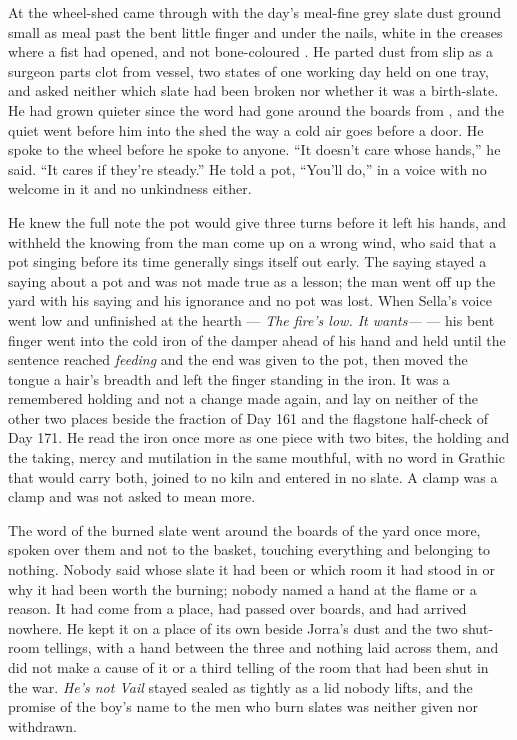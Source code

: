 At the wheel-shed  came through with the day's meal-fine grey slate dust ground small as meal past the bent little finger and under the nails, white in the creases where a fist had opened, and not bone-coloured . He parted dust from slip as a surgeon parts clot from vessel, two states of one working day held on one tray, and asked neither which slate had been broken nor whether it was a birth-slate. He had grown quieter since the word had gone around the boards from , and the quiet went before him into the shed the way a cold air goes before a door. He spoke to the wheel before he spoke to anyone. “It doesn't care whose hands,” he said. “It cares if they're steady.” He told a pot, “You'll do,” in a voice with no welcome in it and no unkindness either.

He knew the full note the pot would give three turns before it left his hands, and withheld the knowing from the man come up on a wrong wind, who said that a pot singing before its time generally sings itself out early. The saying stayed a saying about a pot and was not made true as a lesson; the man went off up the yard with his saying and his ignorance and no pot was lost. When Sella's voice went low and unfinished at the hearth --- \emph{The fire's low. It wants---} --- his bent finger went into the cold iron of the damper ahead of his hand and held until the sentence reached \emph{feeding} and the end was given to the pot, then moved the tongue a hair's breadth and left the finger standing in the iron. It was a remembered holding and not a change made again, and lay on neither of the other two places beside the fraction of Day 161 and the flagstone half-check of Day 171. He read the iron once more as one piece with two bites, the holding and the taking, mercy and mutilation in the same mouthful, with no word in Grathic that would carry both, joined to no kiln and entered in no slate. A clamp was a clamp and was not asked to mean more.

The word of the burned slate went around the boards of the yard once more, spoken over them and not to the basket, touching everything and belonging to nothing. Nobody said whose slate it had been or which room it had stood in or why it had been worth the burning; nobody named a hand at the flame or a reason. It had come from a place, had passed over boards, and had arrived nowhere. He kept it on a place of its own beside Jorra's dust and the two shut-room tellings, with a hand between the three and nothing laid across them, and did not make a cause of it or a third telling of the room that had been shut in the war. \emph{He's not Vail} stayed sealed as tightly as a lid nobody lifts, and the promise of the boy's name to the men who burn slates was neither given nor withdrawn.

